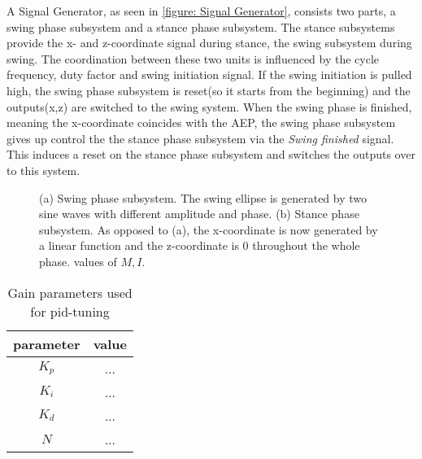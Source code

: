 A Signal Generator, as seen in \ref{figure: Signal Generator}, consists two parts, a swing phase subsystem and a stance phase subsystem.
The stance subsystems provide the x- and z-coordinate signal during stance, the swing subsystem during swing.
The coordination between these two units is influenced by the cycle frequency, duty factor and swing initiation signal.
If the swing initiation is pulled high, the swing phase subsystem is reset(so it starts from the beginning) and the outputs(x,z) are switched to the swing system.
When the swing phase is finished, meaning the x-coordinate coincides with the AEP, the swing phase subsystem gives up control the the stance phase subsystem via the \textit{Swing finished} signal.
This induces a reset on the stance phase subsystem and switches the outputs over to this system.

\begin{figure}
	\centering
	\begin{subfigure}[b]{0.55\textwidth}
		
		\caption{}
		\label{fig:Ng1} 
	\end{subfigure}
	
	\begin{subfigure}[b]{0.55\textwidth}
		
		\caption{}
		\label{fig:Ng2}
	\end{subfigure}
	
	\caption[Swing and Stance Phase]{(a) Swing phase subsystem. The swing ellipse is generated by two sine waves with different amplitude and phase. (b) Stance phase subsystem. As opposed to (a), the x-coordinate is now generated by a linear function and the z-coordinate is 0 throughout the whole phase.
		values of $M,I$.}
\end{figure}




\begin{table}[h]
	\centering
	\begin{tabular}{| c | c |}
		\hline
		parameter & value\\
		\hline
		$K_p$ & ... \\
		\hline
		$K_i$ & ... \\
		\hline
		$K_d$ & ... \\
		\hline
		$N$ & ... \\
		\hline
	\end{tabular}
	\caption{Gain parameters used for pid-tuning}
	\label{table: PID parameters}
\end{table}

